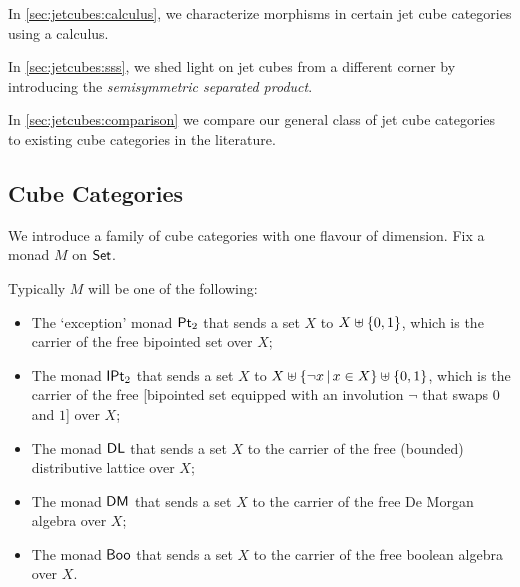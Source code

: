 \documentclass[a4paper]{memoir}
\begin{document}
In \cref{sec:jetcubes:calculus}, we characterize morphisms in certain jet cube categories using a calculus.

In \cref{sec:jetcubes:sss}, we shed light on jet cubes from a different corner by introducing the \emph{semisymmetric separated product}.

In \cref{sec:jetcubes:comparison} we compare our general class of jet cube categories to existing cube categories in the literature.

\subsection{Cube Categories} \label{sec:cubes}
We introduce a family of cube categories with one flavour of dimension. Fix a monad $M$ on ${\mathsf{Set}}$.
\begin{example} \label{ex:cube-monads}
	Typically $M$ will be one of the following:
	\begin{itemize}
		\item The `exception' monad ${\mathsf{Pt}_2}$ that sends a set $X$ to $X \uplus \mathopen{}\left\{ 0,1 \right\}\mathclose{}$, which is the carrier of the free bipointed set over $X$;
		\item The monad ${\mathsf{IPt}_2}$ that sends a set $X$ to $X \uplus \mathopen{}\left\{ \lnot x \,\middle|\, x \in X \right\}\mathclose{} \uplus \mathopen{}\left\{ 0, 1 \right\}\mathclose{}$, which is the carrier of the free [bipointed set equipped with an involution $\lnot$ that swaps $0$ and $1$] over $X$;
		\item The monad $\mathsf{DL}$ that sends a set $X$ to the carrier of the free (bounded) distributive lattice over $X$;
		\item The monad $\mathsf{DM}$ that sends a set $X$ to the carrier of the free De Morgan algebra over $X$;
		\item The monad $\mathsf{Boo}$ that sends a set $X$ to the carrier of the free boolean algebra over $X$.
	\end{itemize}
\end{example}
\end{document}
